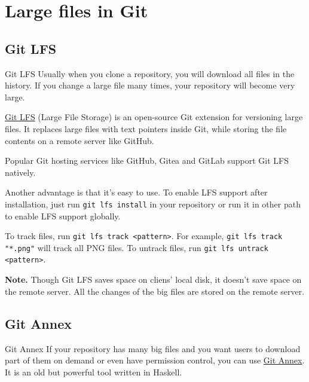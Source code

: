 \documentclass[aspectratio=169]{beamer}
\begin{document}
\section{Large files in Git}

\subsection{Git LFS}

\begin{frame}{Git LFS}
    Usually when you clone a repository, you will download all files in the history. If you change a large file many times, your repository will become very large.

    \pause

    \href{https://git-lfs.com/}{Git LFS} (Large File Storage) is an open-source Git extension for versioning large files. It replaces large files with text pointers inside Git, while storing the file contents on a remote server like GitHub.

    \pause

    Popular Git hosting services like GitHub, Gitea and GitLab support Git LFS natively.

    \pause

    Another advantage is that it's easy to use. To enable LFS support after installation, just run \texttt{git lfs install} in your repository or run it in other path to enable LFS support globally.

    \pause

    To track files, run \texttt{git lfs track <pattern>}. For example, \texttt{git lfs track "*.png"} will track all PNG files. To untrack files, run \texttt{git lfs untrack <pattern>}.

    \pause

    \textbf{Note.} Though Git LFS saves space on cliens' local disk, it doesn't save space on the remote server. All the changes of the big files are stored on the remote server.
\end{frame}

\subsection{Git Annex}

\begin{frame}{Git Annex}
    If your repository has many big files and you want users to download part of them on demand or even have permission control, you can use \href{https://git-annex.branchable.com/}{Git Annex}.
    It is an old but powerful tool written in Haskell.
\end{frame}
\end{document}
